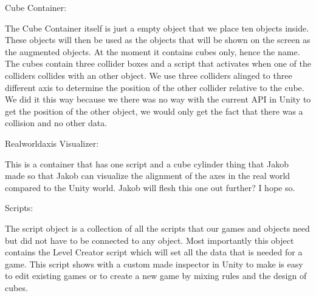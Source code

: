Cube Container:

The Cube Container itself is just a empty object that we place ten objects inside. These objects will then be used as the objects that will be shown on the screen as the augmented objects. At the moment it contains cubes only, hence the name.
The cubes contain three collider boxes and a script that activates when one of the colliders collides with an other object. We use three colliders alinged to three different axis to determine the position of the other collider relative to the cube. We did it this way because we there was no way with the current API in Unity to get the position of the other object, we would only get the fact that there was a collision and no other data.

Realworldaxis Visualizer:

This is a container that has one script and a cube cylinder thing that Jakob made so that Jakob can visualize the alignment of the axes in the real world compared to the Unity world.
Jakob will flesh this one out further? I hope so.

Scripts:

The script object is a collection of all the scripts that our games and objects need but did not have to be connected to any object. Most importantly this object contains the Level Creator script which will set all the data that is needed for a game. This script shows with a custom made inspector in Unity to make is easy to edit existing games or to create a new game by mixing rules and the design of cubes.
